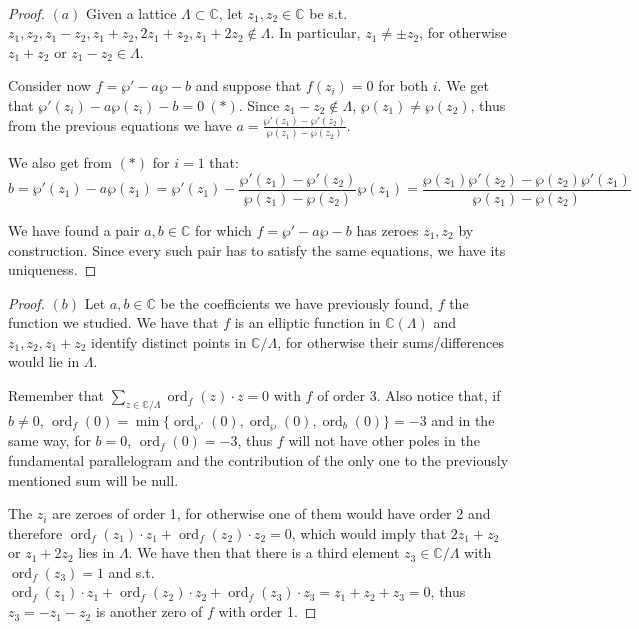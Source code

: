 \documentclass{article}
\newcommand{\numberset}{\mathbb}
\newcommand{\C}{\numberset{C}}
\newcommand{\exercise}[1]{\noindent {\bf Exercise #1}}
\DeclareMathOperator{\ord}{ord}
\begin{document}
~\\
\exercise{4}

\begin{proof}
	$(a)$ Given a lattice $\Lambda\subset\C$, let $z_1,z_2\in\C$ be s.t. $z_1,z_2,z_1-z_2,z_1+z_2,2z_1+z_2,z_1+2z_2\not\in\Lambda$. In particular, $z_1\neq\pm z_2$, for otherwise $z_1+z_2$ or $z_1-z_2\in\Lambda$.
	
	Consider now $f=\wp'-a\wp-b$ and suppose that $f(z_i)=0$ for both $i$.
        We get that $\wp'(z_i)-a\wp(z_i)-b=0\ (*)$. Since $z_1-z_2\not\in
        \Lambda$, $\wp(z_1)\neq\wp(z_2)$, thus from the previous equations we
        have $a=\frac{\wp'(z_1)-\wp'(z_2)}{\wp(z_1)-\wp(z_2)}$.
	
	We also get from $(*)$ for $i=1$ that:$$b=\wp'(z_1)-a\wp(z_1)=\wp'(z_1)-\frac{\wp'(z_1)-\wp'(z_2)}{\wp(z_1)-\wp(z_2)}\wp(z_1)=\frac{\wp(z_1)\wp'(z_2)-\wp(z_2)\wp'(z_1)}{\wp(z_1)-\wp(z_2)}$$
	
	We have found a pair $a,b\in\C$ for which $f=\wp'-a\wp-b$ has zeroes $z_1,z_2$ by construction. Since every such pair has to satisfy the same equations, we have its uniqueness.
\end{proof}

\begin{proof}
	$(b)$ Let $a,b\in\C$ be the coefficients we have previously found, $f$
        the function we studied. We have that $f$ is an elliptic function in $\C(\Lambda)$ and $z_1,z_2,z_1+z_2$ identify distinct points in $\C/\Lambda$, for otherwise their sums/differences would lie in $\Lambda$.
        
        Remember that $\sum_{z\in\C/\Lambda} \ord_f(z)\cdot z=0$ with $f$ of order
        3. Also notice that, if $b\neq 0$, $\ord_f(0)=\min\{\ord_{\wp'}(0),\ord_{\wp}(0),
        \ord_{b}(0)\}=-3$ and in the same way, for $b=0$, $\ord_f(0)=-3$, thus
        $f$ will not have other poles in the fundamental parallelogram and the
        contribution of the only one to the previously mentioned sum will be null.

        The $z_i$ are zeroes of order 1, for otherwise one of them would have
        order 2 and therefore $\ord_f(z_1)\cdot z_1+\ord_f(z_2)\cdot z_2=0$, which
        would imply that $2z_1+z_2$ or $z_1+2z_2$ lies in $\Lambda$. 	
	We have then that there is a third element $z_3\in\C/\Lambda$ with
        $\ord_f(z_3)=1$ and s.t. $\ord_f(z_1)\cdot z_1+\ord_f(z_2)\cdot
        z_2+\ord_f(z_3)\cdot z_3=z_1+z_2+z_3=0$, thus $z_3=-z_1-z_2$ is another
        zero of $f$ with order 1.
\end{proof}
\end{document}
